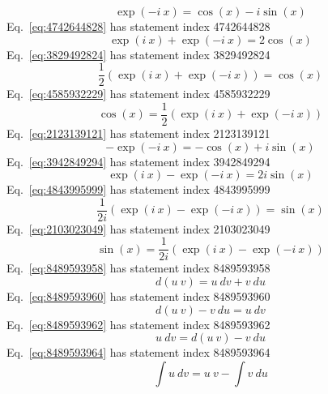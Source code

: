 \documentclass[12pt]{report}
\begin{document}
\begin{equation}
\exp(-i\ x) = \cos(x)-i \sin(x)
\label{eq:4938429484}
\end{equation}
Eq.~\ref{eq:4742644828} has statement index 4742644828
\begin{equation}
\exp(i\ x)+\exp(-i\ x) = 2\cos(x)
\label{eq:4742644828}
\end{equation}
Eq.~\ref{eq:3829492824} has statement index 3829492824
\begin{equation}
\frac{1}{2}\left(\exp(i\ x)+\exp(-i\ x)\right) = \cos(x)
\label{eq:3829492824}
\end{equation}
Eq.~\ref{eq:4585932229} has statement index 4585932229
\begin{equation}
\cos(x) = \frac{1}{2}\left(\exp(i\ x)+\exp(-i\ x)\right)
\label{eq:4585932229}
\end{equation}
Eq.~\ref{eq:2123139121} has statement index 2123139121
\begin{equation}
-\exp(-i\ x) = -\cos(x)+i \sin(x)
\label{eq:2123139121}
\end{equation}
Eq.~\ref{eq:3942849294} has statement index 3942849294
\begin{equation}
\exp(i\ x)-\exp(-i\ x) = 2i \sin(x)
\label{eq:3942849294}
\end{equation}
Eq.~\ref{eq:4843995999} has statement index 4843995999
\begin{equation}
\frac{1}{2i}\left(\exp(i\ x)-\exp(-i\ x)\right) = \sin(x)
\label{eq:4843995999}
\end{equation}
Eq.~\ref{eq:2103023049} has statement index 2103023049
\begin{equation}
\sin(x) = \frac{1}{2i}\left(\exp(i\ x)-\exp(-i\ x)\right)
\label{eq:2103023049}
\end{equation}
Eq.~\ref{eq:8489593958} has statement index 8489593958
\begin{equation}
d(u\ v) = u\ dv + v\ du
\label{eq:8489593958}
\end{equation}
Eq.~\ref{eq:8489593960} has statement index 8489593960
\begin{equation}
d(u\ v) - v\ du= u\ dv
\label{eq:8489593960}
\end{equation}
Eq.~\ref{eq:8489593962} has statement index 8489593962
\begin{equation}
u\ dv = d(u\ v) - v\ du
\label{eq:8489593962}
\end{equation}
Eq.~\ref{eq:8489593964} has statement index 8489593964
\begin{equation}
\int u\ dv = u\ v - \int v\ du
\label{eq:8489593964}
\end{equation}
\end{document}
